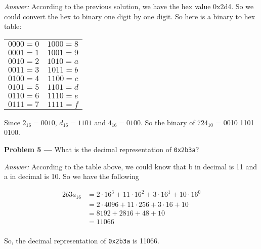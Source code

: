 \documentclass[11pt]{article}
\newcommand{\problem}[1]{\vspace*{2ex}\textbf{Problem #1 ---} }
\newcommand{\answer}{\textit{Answer: }}
\begin{document}
\answer According to the previous solution, we have the hex value 0x2d4. So we could convert the hex to binary one digit by one digit. So here is a binary to hex table: 
\begin{center}
\begin{tabular}{|c|c|}
\hline
$0000 = 0$     &  $1000 = 8$\\
$0001 = 1$     &  $1001 = 9$\\
$0010 = 2$     &  $1010 = a$\\
$0011 = 3$     &  $1011 = b$\\
$0100 = 4$     &  $1100 = c$\\
$0101 = 5$     &  $1101 = d$\\
$0110 = 6$     &  $1110 = e$\\
$0111 = 7$     &  $1111 = f$\\  
\hline
\end{tabular}
\end{center}
Since $2_{16} = 0010$, $d_{16} = 1101$ and $4_{16} = 0100$. So the binary of $724_{10}$ = 0010 1101 0100.

\problem{5} What is the decimal representation of \texttt{0x2b3a}?

\answer According to the table above, we could know that b in decimal is 11 and a in decimal is 10. So we have the following

\begin{align*}
2b3a_{16} &= 2 \cdot 16^3 + 11 \cdot 16^2 + 3 \cdot 16^1 + 10 \cdot 16^0 \\
& = 2 \cdot 4096 + 11 \cdot 256 + 3\cdot 16 + 10 \\
& = 8192 + 2816 + 48 +10 \\
& = 11066\\
\end{align*}

So, the decimal representation of \texttt{0x2b3a} is 11066.
\end{document}
